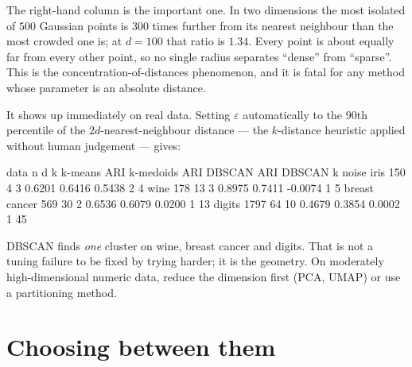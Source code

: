 \documentclass[11pt]{article}
\begin{document}
The right-hand column is the important one. In two dimensions the most
isolated of $500$ Gaussian points is $300$ times further from its nearest
neighbour than the most crowded one is; at $d = 100$ that ratio is $1.34$.
Every point is about equally far from every other point, so no single radius
separates ``dense'' from ``sparse''. This is the concentration-of-distances
phenomenon, and it is fatal for any method whose parameter is an absolute
distance.

It shows up immediately on real data. Setting $\varepsilon$ automatically to
the $90$th percentile of the $2d$-nearest-neighbour distance --- the
$k$-distance heuristic applied without human judgement --- gives:

\begin{codeout}
  data            n     d   k   k-means ARI  k-medoids ARI  DBSCAN ARI  DBSCAN k  noise
  iris            150     4   3       0.6201        0.6416      0.5438       2       4
  wine            178    13   3       0.8975        0.7411     -0.0074       1       5
  breast cancer   569    30   2       0.6536        0.6079      0.0200       1      13
  digits         1797    64  10       0.4679        0.3854      0.0002       1      45
\end{codeout}

DBSCAN finds \emph{one} cluster on wine, breast cancer and digits. That is not
a tuning failure to be fixed by trying harder; it is the geometry. On
moderately high-dimensional numeric data, reduce the dimension first (PCA,
UMAP) or use a partitioning method.

\section{Choosing between them}
\label{sec:choose}
\end{document}
